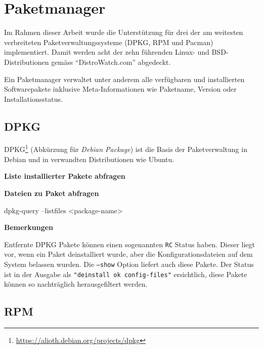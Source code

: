 

\section{Paketmanager}
\label{swidgenerator:paketmanager}

Im Rahmen dieser Arbeit wurde die Unterstützung für drei der am weitesten
verbreiteten Paketverwaltungssysteme (DPKG, RPM und Pacman) implementiert. Damit
werden acht der zehn führenden Linux- und BSD-Distributionen gemäss
\enquote{DistroWatch.com}\cite{distrowatch:2014} abgedeckt.

Ein Paketmanager verwaltet unter anderem alle verfügbaren und installierten
Softwarepakete inklusive Meta-Informationen wie Paketname, Version oder
Installationsstatus.

\subsection{DPKG}

DPKG\footnote{\url{https://alioth.debian.org/projects/dpkg}} (Abkürzung für
\textit{Debian Package}) ist die Basis der Paketverwaltung in Debian und in
verwandten Distributionen wie Ubuntu.

\textbf{Liste installierter Pakete abfragen}


\textbf{Dateien zu Paket abfragen}

\begin{bashcode}
dpkg-query --listfiles <package-name>
\end{bashcode}

\textbf{Bemerkungen}

Entfernte DPKG Pakete können einen sogenannten \texttt{RC} Status haben. Dieser liegt
vor, wenn ein Paket deinstalliert wurde, aber die Konfigurationsdateien auf dem
System belassen wurden. Die \texttt{---show} Option liefert auch diese Pakete.
Der Status ist in der Ausgabe als \texttt{"deinstall ok config-files"}
ersichtlich, diese Pakete können so nachträglich herausgefiltert werden.


\subsection{RPM}

